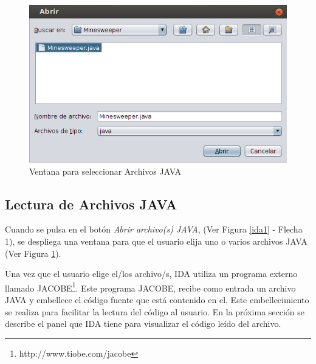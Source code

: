 \pagebreak

\begin{figure}[t] %
\centerline{%
\includegraphics[scale= 0.7]{./cap4/ida_02.png}
}
\caption{Ventana para seleccionar Archivos JAVA}
\label{ida2}
\end{figure}

\vspace{-1em}

\subsection{Lectura de Archivos JAVA}

Cuando se pulsa en el botón \textit{Abrir archivo(s) JAVA}, (Ver Figura \ref{ida1} - Flecha 1), se despliega una ventana para que el usuario elija uno o varios archivos JAVA (Ver Figura \ref{ida2}). 


Una vez que el usuario elige el/los archivo/s, IDA utiliza un  programa externo llamado JACOBE\footnote[1]{http://www.tiobe.com/jacobe}. Este programa JACOBE, recibe como entrada un archivo JAVA y embellece el código fuente que está contenido en el. Este embellecimiento se realiza para facilitar la lectura del código al usuario. En la próxima sección se describe el panel que IDA tiene para visualizar el código leído del archivo.


